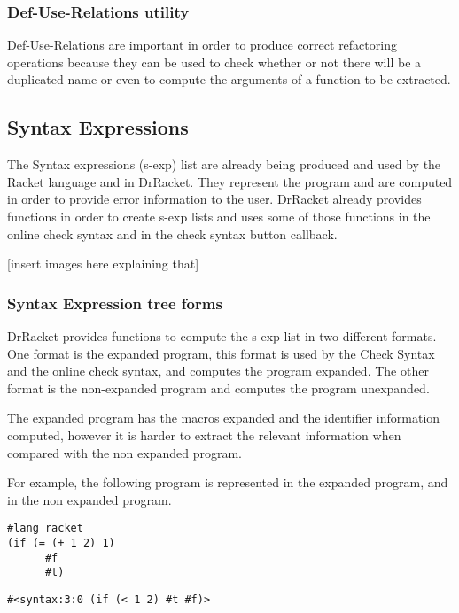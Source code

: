 \subsubsection{Def-Use-Relations utility}
Def-Use-Relations are important in order to produce correct refactoring operations
because they can be used to check whether or not there will be a duplicated name
or even to compute the arguments of a function to be extracted.


\subsection{Syntax Expressions}
The Syntax expressions (s-exp) list are already being produced and used by the
Racket language and in DrRacket. They represent the program and are computed in
order to provide error information to the user.
DrRacket already provides functions in order to create s-exp lists and uses some of those
functions in the online check syntax and in the check syntax button callback.

[insert images here explaining that]


\subsubsection{Syntax Expression tree forms}
DrRacket provides functions to compute the s-exp list in two different formats.
One format is the expanded program, this format is used by the Check Syntax and
the online check syntax, and computes the program expanded.
The other format is the non-expanded program and computes the program unexpanded.

The expanded program has the macros expanded and the identifier information computed,
however it is harder to extract the relevant information when compared with the
non expanded program.

For example, the following program is represented in the expanded program,
and in the non expanded program.
\begin{lstlisting}[caption="example"]
#lang racket
(if (= (+ 1 2) 1)
      #f
      #t)
\end{lstlisting}

\begin{lstlisting}[caption="Syntax from Example"]
#<syntax:3:0 (if (< 1 2) #t #f)>
\end{lstlisting}

